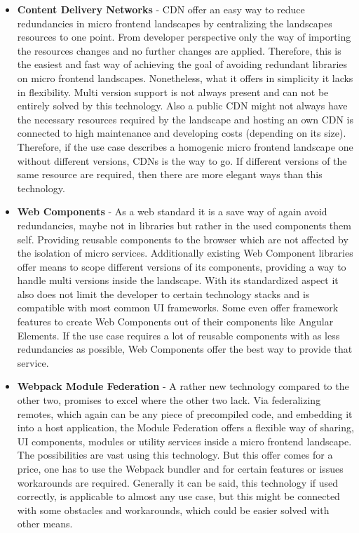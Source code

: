 \begin{itemize}
	\item \textbf{Content Delivery Networks} - CDN offer an easy way to reduce redundancies in micro frontend landscapes by centralizing the landscapes resources to one point. From developer perspective only the way of importing the resources changes and no further changes are applied. Therefore, this is the easiest and fast way of achieving the goal of avoiding redundant libraries on micro frontend landscapes. Nonetheless, what it offers in simplicity it lacks in flexibility. Multi version support is not always present and can not be entirely solved by this technology. Also a public CDN might not always have the necessary resources required by the landscape and hosting an own CDN is connected to high maintenance and developing costs (depending on its size). Therefore, if the use case describes a homogenic micro frontend landscape one without different versions, CDNs is the way to go. If different versions of the same resource are required, then there are more elegant ways than this technology.
	
	\item \textbf{Web Components} - As a web standard it is a save way of again avoid redundancies, maybe not in libraries but rather in the used components them self. Providing reusable components to the browser which are not affected by the isolation of micro services. Additionally existing Web Component libraries offer means to scope different versions of its components, providing a way to handle multi versions inside the landscape. With its standardized aspect it also does not limit the developer to certain technology stacks and is compatible with most common UI frameworks. Some even offer framework features to create Web Components out of their components like Angular Elements. If the use case requires a lot of reusable components with as less redundancies as possible, Web Components offer the best way to provide that service.
	
	\item \textbf{Webpack Module Federation} - A rather new technology compared to the other two, promises to excel where the other two lack. Via federalizing remotes, which again can be any piece of precompiled code, and embedding it into a host application, the Module Federation offers a flexible way of sharing, UI components, modules or utility services inside a micro frontend landscape. The possibilities are vast using this technology. But this offer comes for a price, one has to use the Webpack bundler and for certain features or issues workarounds are required. 
	Generally it can be said, this technology if used correctly, is applicable to almost any use case, but this might be connected with some obstacles and workarounds, which could be easier solved with other means. 
\end{itemize}

